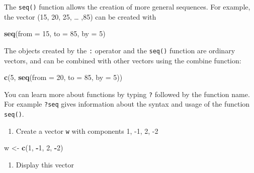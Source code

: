 \documentclass[
]{book}
\newenvironment{Shaded}{\begin{snugshade}}{\end{snugshade}}
\newcommand{\AttributeTok}[1]{\textcolor[rgb]{0.13,0.29,0.53}{#1}}
\newcommand{\DecValTok}[1]{\textcolor[rgb]{0.00,0.00,0.81}{#1}}
\newcommand{\FunctionTok}[1]{\textcolor[rgb]{0.13,0.29,0.53}{\textbf{#1}}}
\newcommand{\NormalTok}[1]{#1}
\newcommand{\OtherTok}[1]{\textcolor[rgb]{0.56,0.35,0.01}{#1}}
\newcommand{\SpecialCharTok}[1]{\textcolor[rgb]{0.81,0.36,0.00}{\textbf{#1}}}
\providecommand{\tightlist}{%
  \setlength{\itemsep}{0pt}\setlength{\parskip}{0pt}}
\begin{document}
The \texttt{seq()} function allows the creation of more general
sequences. For example, the vector (15, 20, 25, \ldots{} ,85) can be created
with

\begin{Shaded}
\begin{Highlighting}[]
\FunctionTok{seq}\NormalTok{(}\AttributeTok{from =} \DecValTok{15}\NormalTok{, }\AttributeTok{to =} \DecValTok{85}\NormalTok{, }\AttributeTok{by =} \DecValTok{5}\NormalTok{)}
\end{Highlighting}
\end{Shaded}

The objects created by the \texttt{:} operator and the \texttt{seq()} function
are ordinary vectors, and can be combined with other vectors using the
combine function:

\begin{Shaded}
\begin{Highlighting}[]
\FunctionTok{c}\NormalTok{(}\DecValTok{5}\NormalTok{, }\FunctionTok{seq}\NormalTok{(}\AttributeTok{from =} \DecValTok{20}\NormalTok{, }\AttributeTok{to =} \DecValTok{85}\NormalTok{, }\AttributeTok{by =} \DecValTok{5}\NormalTok{))}
\end{Highlighting}
\end{Shaded}

You can learn more about functions by typing \texttt{?} followed by the
function name. For example \texttt{?seq} gives information about the
syntax and usage of the function \texttt{seq()}.

\begin{enumerate}
\def\labelenumi{\arabic{enumi}.}
\tightlist
\item
  Create a vector \texttt{w} with components 1, -1, 2, -2
\end{enumerate}

\begin{Shaded}
\begin{Highlighting}[]
\NormalTok{w }\OtherTok{\textless{}{-}} \FunctionTok{c}\NormalTok{(}\DecValTok{1}\NormalTok{, }\SpecialCharTok{{-}}\DecValTok{1}\NormalTok{, }\DecValTok{2}\NormalTok{, }\SpecialCharTok{{-}}\DecValTok{2}\NormalTok{)}
\end{Highlighting}
\end{Shaded}

\begin{enumerate}
\def\labelenumi{\arabic{enumi}.}
\setcounter{enumi}{1}
\tightlist
\item
  Display this vector
\end{enumerate}
\end{document}

